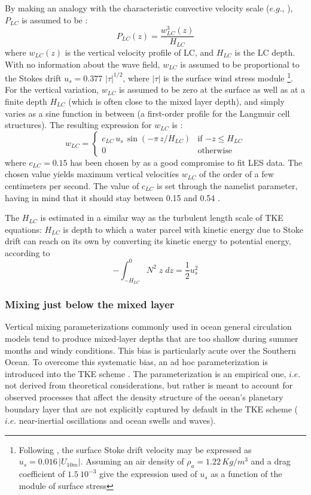 \documentclass[../main/NEMO_manual]{subfiles}
\begin{document}
By making an analogy with the characteristic convective velocity scale ($e.g.$, \citet{D'Alessio_al_JPO98}),
$P_{LC}$ is assumed to be : 
\[
P_{LC}(z) = \frac{w_{LC}^3(z)}{H_{LC}}
\]
where $w_{LC}(z)$ is the vertical velocity profile of LC, and $H_{LC}$ is the LC depth.
With no information about the wave field, $w_{LC}$ is assumed to be proportional to 
the Stokes drift $u_s = 0.377\,\,|\tau|^{1/2}$, where $|\tau|$ is the surface wind stress module 
\footnote{Following \citet{Li_Garrett_JMR93}, the surface Stoke drift velocity may be expressed as
  $u_s =  0.016 \,|U_{10m}|$.
  Assuming an air density of $\rho_a=1.22 \,Kg/m^3$ and a drag coefficient of
  $1.5~10^{-3}$ give the expression used of $u_s$ as a function of the module of surface stress
}.
For the vertical variation, $w_{LC}$ is assumed to be zero at the surface as well as at
a finite depth $H_{LC}$ (which is often close to the mixed layer depth),
and simply varies as a sine function in between (a first-order profile for the Langmuir cell structures). 
The resulting expression for $w_{LC}$ is :
\[
  w_{LC}  =
  \begin{cases}
    c_{LC} \,u_s \,\sin(- \pi\,z / H_{LC} )    &      \text{if $-z \leq H_{LC}$} 	\\
    0                 				 &      \text{otherwise}
  \end{cases}
\]
where $c_{LC} = 0.15$ has been chosen by \citep{Axell_JGR02} as a good compromise to fit LES data.
The chosen value yields maximum vertical velocities $w_{LC}$ of the order of a few centimeters per second.
The value of $c_{LC}$ is set through the  namelist parameter,
having in mind that it should stay between 0.15 and 0.54 \citep{Axell_JGR02}. 

The $H_{LC}$ is estimated in a similar way as the turbulent length scale of TKE equations:
$H_{LC}$ is depth to which a water parcel with kinetic energy due to Stoke drift can reach on its own by
converting its kinetic energy to potential energy, according to 
\[
- \int_{-H_{LC}}^0 { N^2\;z  \;dz} = \frac{1}{2} u_s^2
\]

\subsubsection{Mixing just below the mixed layer}

Vertical mixing parameterizations commonly used in ocean general circulation models tend to
produce mixed-layer depths that are too shallow during summer months and windy conditions.
This bias is particularly acute over the Southern Ocean.
To overcome this systematic bias, an ad hoc parameterization is introduced into the TKE scheme \cite{Rodgers_2014}. 
The parameterization is an empirical one, $i.e.$ not derived from theoretical considerations,
but rather is meant to account for observed processes that affect the density structure of 
the ocean’s planetary boundary layer that are not explicitly captured by default in the TKE scheme 
($i.e.$ near-inertial oscillations and ocean swells and waves).
\end{document}
